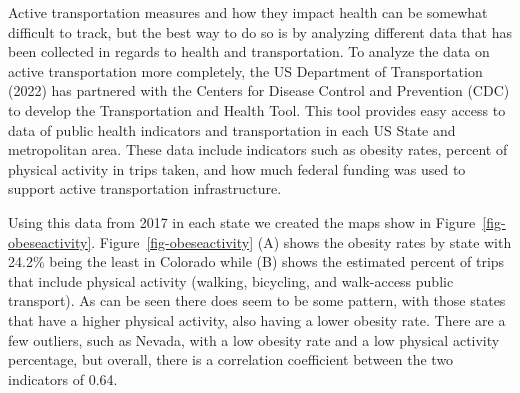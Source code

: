\documentclass[
  letterpaper,
  DIV=11,
  numbers=noendperiod]{scrreport}
\begin{document}
Active transportation measures and how they impact health can be
somewhat difficult to track, but the best way to do so is by analyzing
different data that has been collected in regards to health and
transportation. To analyze the data on active transportation more
completely, the US Department of Transportation (2022) has partnered
with the Centers for Disease Control and Prevention (CDC) to develop the
Transportation and Health Tool. This tool provides easy access to data
of public health indicators and transportation in each US State and
metropolitan area. These data include indicators such as obesity rates,
percent of physical activity in trips taken, and how much federal
funding was used to support active transportation infrastructure.

Using this data from 2017 in each state we created the maps show in
Figure~\ref{fig-obeseactivity}. Figure~\ref{fig-obeseactivity} (A) shows
the obesity rates by state with 24.2\% being the least in Colorado while
(B) shows the estimated percent of trips that include physical activity
(walking, bicycling, and walk-access public transport). As can be seen
there does seem to be some pattern, with those states that have a higher
physical activity, also having a lower obesity rate. There are a few
outliers, such as Nevada, with a low obesity rate and a low physical
activity percentage, but overall, there is a correlation coefficient
between the two indicators of 0.64.
\end{document}
